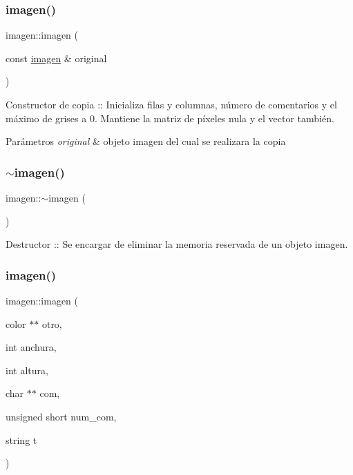 \subsubsection{\texorpdfstring{imagen()}{imagen()}\hspace{0.1cm}{\footnotesize\ttfamily [3/4]}}
{\footnotesize\ttfamily imagen\+::imagen (\begin{DoxyParamCaption}\item[{const \mbox{\hyperlink{classimagen}{imagen}} \&}]{original }\end{DoxyParamCaption})}

Constructor de copia \+:\+: Inicializa filas y columnas, número de comentarios y el máximo de grises a 0. Mantiene la matriz de píxeles nula y el vector también. 
\begin{DoxyParams}{Parámetros}
{\em original} & objeto imagen del cual se realizara la copia \\
\hline
\end{DoxyParams}
\mbox{\label{classimagen_a1efdf77f6e6af0e528f0b7e8665d0060}} 
\subsubsection{\texorpdfstring{$\sim$imagen()}{~imagen()}}
{\footnotesize\ttfamily imagen\+::$\sim$imagen (\begin{DoxyParamCaption}{ }\end{DoxyParamCaption})}

Destructor \+:\+: Se encargar de eliminar la memoria reservada de un objeto imagen. \mbox{\label{classimagen_a61cb9de8b7733a8f2e53a37e45105785}} 
\subsubsection{\texorpdfstring{imagen()}{imagen()}\hspace{0.1cm}{\footnotesize\ttfamily [4/4]}}
{\footnotesize\ttfamily imagen\+::imagen (\begin{DoxyParamCaption}\item[{color $\ast$$\ast$}]{otro,  }\item[{int}]{anchura,  }\item[{int}]{altura,  }\item[{char $\ast$$\ast$}]{com,  }\item[{unsigned short}]{num\+\_\+com,  }\item[{string}]{t }\end{DoxyParamCaption})}

